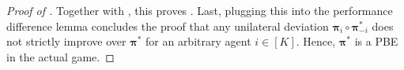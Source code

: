 \begin{proof}[Proof of ]
Together with , this proves . Last, plugging this into the performance difference lemma  concludes the proof that any unilateral deviation $\bm \pi_i\circ {\bm \pi}_{-i}^\ast$ does not strictly improve over $\bm \pi^\ast$ for an arbitrary agent $i\in [K]$. Hence, $\bm \pi^\ast$ is a PBE in the actual game.
\end{proof}

